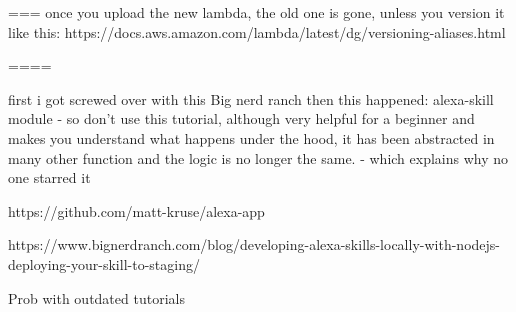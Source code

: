  ===
once you upload the new lambda, the old one is gone, unless you version it like this:
https://docs.aws.amazon.com/lambda/latest/dg/versioning-aliases.html



====

first i got screwed over with this Big nerd ranch then this happened: alexa-skill module
- so don't use this tutorial, although very helpful for a beginner and makes you understand what happens under the hood, it has been abstracted in many other function and the logic is no longer the same. - which explains why no one starred it

https://github.com/matt-kruse/alexa-app

https://www.bignerdranch.com/blog/developing-alexa-skills-locally-with-nodejs-deploying-your-skill-to-staging/




Prob with outdated tutorials

